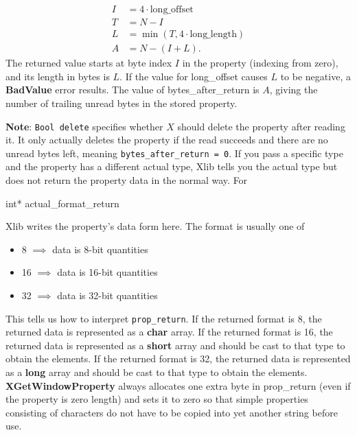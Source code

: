 \documentclass{report}
\begin{document}
\begin{itemize}
\begin{itemize}
\begin{align*}
                    I &= 4 \cdot \text{long\_offset} \\
                    T &= N - I \\
                    L &= \min(T, 4\cdot \text{long\_length}) \\
                    A &= N - (I+L)
                .\end{align*}
                The returned value starts at byte index $I$ in the property (indexing from zero), and its length in bytes is $L$. If the value for long\_offset causes $L$ to be negative, a \textbf{BadValue} error results. The value of bytes\_after\_return is $A$, giving the number of trailing unread bytes in the stored property.
        \end{itemize}
        \textbf{Note}: \texttt{Bool delete} specifies whether $X$ should delete the property after reading it. It only actually deletes the property if the read succeeds and there are no unread bytes left, meaning \texttt{bytes\_after\_return = 0}.
        \bigbreak \noindent 
        If you pass a specific type and the property has a different actual type, Xlib tells you the actual type but does not return the property data in the normal way.
        \bigbreak \noindent 
        For 
        \bigbreak \noindent 
        \begin{cppcode}
        int* actual_format_return
        \end{cppcode}
        \bigbreak \noindent 
        Xlib writes the property's data form here. The format is usually one of
        \begin{itemize}
            \item 8 $\implies $ data is 8-bit quantities
            \item 16 $\implies$ data is 16-bit quantities
            \item 32 $\implies$ data is 32-bit quantities
        \end{itemize}
        This tells us how to interpret \texttt{prop\_return}.
        \bigbreak \noindent 
        If the returned format is 8, the returned data is represented as a \textbf{char} array. If the returned format is 16, the returned data is represented as a \textbf{short} array and should be cast to that type to obtain the elements. If the returned format is 32, the returned data is represented as a \textbf{long} array and should be cast to that type to obtain the elements.
        \bigbreak \noindent 
        \textbf{XGetWindowProperty} always allocates one extra byte in prop\_return (even if the property is zero length) and sets it to zero so that simple properties consisting of characters do not have to be copied into yet another string before use.

\end{itemize}
\end{document}
